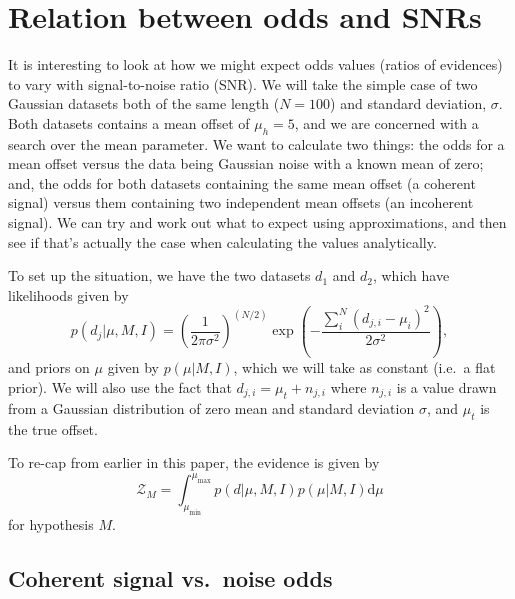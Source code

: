 \section{Relation between odds and SNRs}\label{app:oddratios}

It is interesting to look at how we might expect odds values (ratios of evidences) to vary with signal-to-noise ratio (SNR). We will take the simple case of two Gaussian
datasets both of the same length ($N = 100$) and standard deviation, $\sigma$. Both datasets contains a mean offset of $\mu_h = 5$, and we are concerned with a
search over the mean parameter. We want to calculate two things: the odds for a mean offset versus the data being Gaussian noise with a known mean of zero; and,
the odds for both datasets containing the same mean offset (a coherent signal) versus them containing two independent mean offsets (an incoherent signal). We can
try and work out what to expect using approximations, and then see if that's actually the case when calculating the values analytically.

To set up the situation, we have the two datasets $d_1$ and $d_2$, which have likelihoods given by
\begin{equation}
 p(d_j|\mu,M,I) = \left(\frac{1}{2\pi\sigma^2}\right)^{(N/2)} \exp{\left(-\frac{\sum_i^N (d_{j,i}-\mu_i)^2}{2\sigma^2}\right)},
\end{equation}
and priors on $\mu$ given by $p(\mu|M,I)$, which we will take as constant (i.e.\ a flat prior). We will also use the fact that $d_{j,i} = \mu_t + n_{j,i}$
where $n_{j,i}$ is a value drawn from a Gaussian distribution of zero mean and standard deviation $\sigma$, and $\mu_t$ is the true offset.

To re-cap from earlier in this paper, the evidence is given by
\begin{equation}
\mathcal{Z}_M = \int_{\mu_{\text{min}}}^{\mu_{\text{max}}} p(d|\mu, M, I) p(\mu|M,I) {\text{d}\mu}
\end{equation}
for hypothesis $M$.

\subsection{Coherent signal vs.\ noise odds}

